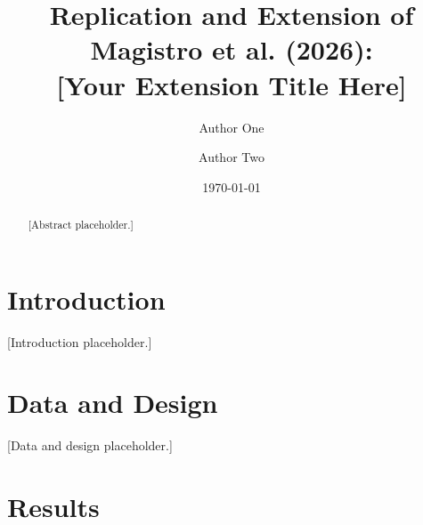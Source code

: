 \documentclass[12pt]{article}
\title{%
  Replication and Extension of Magistro et al. (2026):\\
  [Your Extension Title Here]
}
\author{
  Author One \and Author Two
}
\date{\today}
\begin{document}
\maketitle

\begin{abstract}
[Abstract placeholder.]
\end{abstract}

\newpage

\section{Introduction}
\label{sec:intro}


[Introduction placeholder.]

\section{Data and Design}
\label{sec:design}


[Data and design placeholder.]

\section{Results}
\label{sec:results}
\end{document}
